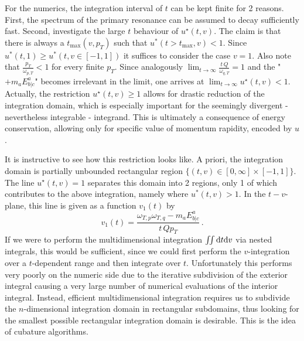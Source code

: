 For the numerics, the integration interval of $t$ can be kept finite for 2 reasons. First, the spectrum of the primary resonance can be assumed to decay sufficiently fast. Second, investigate the large $t$ behaviour of $u^\star(t,v)$. The claim is that there is always a $t_{\text{max}}(v,p_T)$ such that ${u^*(t>t_{\text{max}},v)<1}$. Since ${u^*(t,1)\geq u^*(t,v\in[-1,1])}$ it suffices to consider the case $v=1$. Also note that ${\frac{p_T}{\omega_{p,T}}<1}$ for every finite $p_T$. Since analogously ${\lim_{t\to\infty}\frac{t\,Q}{\omega_{q,T}}=1}$ and the "${+m_a E^a_{b\vert c}}$" becomes irrelevant in the limit, one arrives at ${\lim_{t\to\infty}u^\star(t,v)<1}$. Actually, the restriction ${u^\star(t,v)\geq 1}$ allows for drastic reduction of the integration domain, which is especially important for the seemingly divergent - nevertheless integrable - integrand. This is ultimately a consequence of energy conservation, allowing only for specific value of momentum rapidity, encoded by $u$.

It is instructive to see how this restriction looks like. A priori, the integration domain is partially unbounded rectangular region ${\{(t,v)\in[0,\infty]\times[-1,1]\}}$. The line ${u^\star(t,v)=1}$ separates this domain into 2 regions, only 1 of which contributes to the above integration, namely where ${u^*(t,v)>1}$. In the $t-v$-plane, this line is given as a function ${v_1(t)}$ by
\begin{equation}
    v_1(t)=\frac{\omega_{T,p}\omega_{T,q}-m_aE^a_{b\vert c}}{t\,Qp_T}\,.
    \label{eq:DecayCalc_v1t}
\end{equation}
If we were to perform the multidimensional integration ${\iint\text{d} t\text{d} v}$ via nested integrals, this would be sufficient, since we could first perform the $v$-integration over a $t$-dependent range and then integrate over $t$. Unfortunately this performs very poorly on the numeric side due to the iterative subdivision of the exterior integral causing a very large number of numerical evaluations of the interior integral. Instead, efficient multidimensional integration requires us to subdivide the $n$-dimensional integration domain in rectangular subdomains, thus looking for the smallest possible rectangular integration domain is desirable. This is the idea of cubature algorithms.

